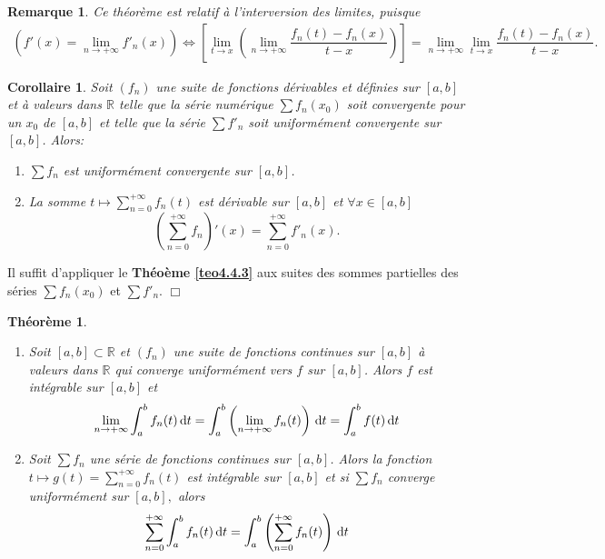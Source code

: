 \documentclass[11pt, a4paper]{book}
\newtheorem{teo}{Th\'eor\`eme}[section]
\newtheorem{rem}{Remarque}[section]
\newtheorem{cor}{Corollaire}[section]
\newenvironment{pr}{\noindent {\bf Preuve} \noindent} {\hfill $\Box$\vskip 5mm}
\begin{document}
\begin{rem} Ce th\'eor\`eme est relatif \`a l'interversion des limites, puisque \begin{align*}
 \left( f'(x)=\lim_{n\rightarrow +\infty}f'_n(x)\right)\Leftrightarrow \left[\lim_{t\rightarrow x}\left(\lim_{n\rightarrow+\infty}\dfrac{f_n(t)-f_n(x)}{t-x}\right)\right]=\lim_{n\rightarrow+\infty}\lim_{t\rightarrow x}\dfrac{f_n(t)-f_n(x)}{t-x}.
\end{align*}
\end{rem}
\begin{cor} \label{cor4.4.1} Soit $(f_n)$ une suite de fonctions d\'erivables et d\'efinies sur $[a,b]$ et \`a valeurs dans $\mathbb{R}$ telle que la s\'erie num\'erique $\sum f_n(x_0)$ soit convergente pour un $x_0$ de $[a,b]$ et telle que la s\'erie $\sum f'_n$ soit uniform\'ement convergente sur $[a,b]$. Alors:
\begin{enumerate}
\item $\sum f_n$ est uniform\'ement convergente sur $[a,b]$.
\item La somme ${\displaystyle t\mapsto \sum_{n=0}^{+\infty}f_n(t)}$ est d\'erivable sur $[a,b]$ et $\forall x\in [a,b]$ $$\left(\sum_{n=0}^{+\infty}f_n\right)'(x)=\sum_{n=0}^{+\infty} f'_n(x).$$
\end{enumerate}
\end{cor}
\begin{pr}\quad
Il suffit d'appliquer le \textbf{Th\'eo\`eme \ref{teo4.4.3}} aux suites des sommes partielles des s\'eries $\sum f_n(x_0)$ et $\sum f'_n$.
\end{pr}
\begin{teo} \label{teo4.4.4}
\begin{enumerate}
\item \label{teo4.4.4.1} Soit $[a,b]\subset \mathbb{R}$ et $(f_n)$ une suite de fonctions continues sur $[a,b]$ \`a valeurs dans $\mathbb{R}$ qui converge uniform\'ement vers $f$ sur $[a,b]$. Alors $f$ est int\'egrable sur $[a,b]$ et $$\lim_{n\rightarrow+\infty}\int_a^b f_n(t)\,\mathrm{d} t=\int_a^b \left( \lim_{n\rightarrow+\infty}f_n(t)\right)\,\mathrm{d} t=\int_a^b f(t)\,\mathrm{d} t$$
\item \label{teo4.4.4.2} Soit $\sum f_n$ une s\'erie de fonctions continues sur $[a,b]$. Alors la fonction ${\displaystyle t\longmapsto g(t)=\sum_{n=0}^{+\infty} f_n(t)}$ est int\'egrable sur $[a,b]$ et si $\sum f_n$ converge uniform\'ement sur $[a,b],$ alors $$ \sum_{n=0}^{+\infty}\int_a^bf_n(t)\,\mathrm{d} t=\int_a^b\left(\sum_{n=0}^{+\infty} f_n(t)\right)\,\mathrm{d} t$$
\end{enumerate}
\end{teo}
\end{document}
